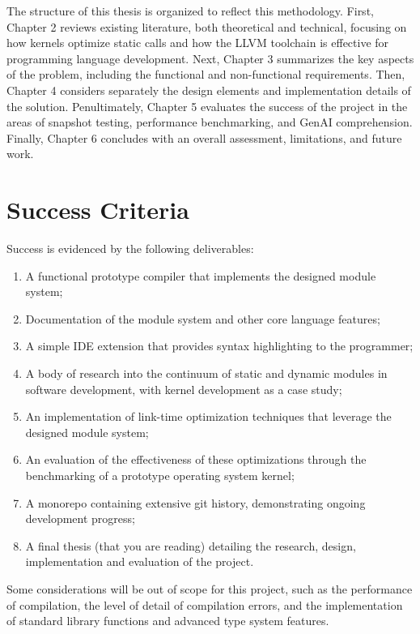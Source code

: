\documentclass[12pt,a4paper,twoside]{report}
\begin{document}
The structure of this thesis is organized to reflect this methodology. First, Chapter 2 reviews existing literature, both theoretical and technical, focusing on how kernels optimize static calls and how the LLVM toolchain is effective for programming language development. Next, Chapter 3 summarizes the key aspects of the problem, including the functional and non-functional requirements. Then, Chapter 4 considers separately the design elements and implementation details of the solution. Penultimately, Chapter 5 evaluates the success of the project in the areas of snapshot testing, performance benchmarking, and GenAI comprehension. Finally, Chapter 6 concludes with an overall assessment, limitations, and future work.

\section{Success Criteria}

Success is evidenced by the following deliverables:

\begin{enumerate}
	\item A functional prototype compiler that implements the designed module system;
	\item Documentation of the module system and other core language features;
	\item A simple IDE extension that provides syntax highlighting to the programmer;
	\item A body of research into the continuum of static and dynamic modules in software development, with kernel development as a case study;
	\item An implementation of link-time optimization techniques that leverage the designed module system;
	\item An evaluation of the effectiveness of these optimizations through the benchmarking of a prototype operating system kernel;
	\item A monorepo containing extensive git history, demonstrating ongoing development progress;
	\item A final thesis (that you are reading) detailing the research, design, implementation and evaluation of the project.
\end{enumerate}

Some considerations will be out of scope for this project, such as the performance of compilation, the level of detail of compilation errors, and the implementation of standard library functions and advanced type system features.
\end{document}

